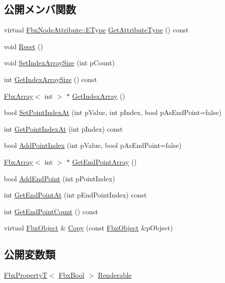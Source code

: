 \subsection*{公開メンバ関数}
\begin{DoxyCompactItemize}
\item 
virtual \hyperlink{class_fbx_node_attribute_a08e1669d3d1a696910756ab17de56d6a}{Fbx\+Node\+Attribute\+::\+E\+Type} \hyperlink{class_fbx_line_a3307097464d924b2c95c6687e41d69c9}{Get\+Attribute\+Type} () const
\item 
void \hyperlink{class_fbx_line_a68cc770a24367ac688fa3f96cdd5ed1f}{Reset} ()
\item 
void \hyperlink{class_fbx_line_ae954e7ff77330b0da208d727b194bf75}{Set\+Index\+Array\+Size} (int p\+Count)
\item 
int \hyperlink{class_fbx_line_a8055b3ec4b3dde0a73681716a33c77f5}{Get\+Index\+Array\+Size} () const
\item 
\hyperlink{class_fbx_array}{Fbx\+Array}$<$ int $>$ $\ast$ \hyperlink{class_fbx_line_abbb803913ad6eeb89e79eb3d9f58d3c2}{Get\+Index\+Array} ()
\item 
bool \hyperlink{class_fbx_line_a891629171b278b9ed9f8ebde8acca2b1}{Set\+Point\+Index\+At} (int p\+Value, int p\+Index, bool p\+As\+End\+Point=false)
\item 
int \hyperlink{class_fbx_line_a6ff2971e12ada06a4e724b97d149a875}{Get\+Point\+Index\+At} (int p\+Index) const
\item 
bool \hyperlink{class_fbx_line_a0829ee40fdecef0b749c3b026744c31a}{Add\+Point\+Index} (int p\+Value, bool p\+As\+End\+Point=false)
\item 
\hyperlink{class_fbx_array}{Fbx\+Array}$<$ int $>$ $\ast$ \hyperlink{class_fbx_line_aeeb413ccc5affa0f04d1b5275d355c9b}{Get\+End\+Point\+Array} ()
\item 
bool \hyperlink{class_fbx_line_ad648323a73b0b4f1bf9cfae2fdb65e23}{Add\+End\+Point} (int p\+Point\+Index)
\item 
int \hyperlink{class_fbx_line_a5a0bcc66d6ba13f98fd9e546bf5f704a}{Get\+End\+Point\+At} (int p\+End\+Point\+Index) const
\item 
int \hyperlink{class_fbx_line_a629b16ba4261ed6fdd77d8ae769f4026}{Get\+End\+Point\+Count} () const
\item 
virtual \hyperlink{class_fbx_object}{Fbx\+Object} \& \hyperlink{class_fbx_line_aeb9e0c53cf02d3e4e206b25c87c06256}{Copy} (const \hyperlink{class_fbx_object}{Fbx\+Object} \&p\+Object)
\end{DoxyCompactItemize}
\subsection*{公開変数類}
\begin{DoxyCompactItemize}
\item 
\hyperlink{class_fbx_property_t}{Fbx\+PropertyT}$<$ \hyperlink{fbxtypes_8h_a92e0562b2fe33e76a242f498b362262e}{Fbx\+Bool} $>$ \hyperlink{class_fbx_line_ab030d081f8127e48e92654e38fe2328e}{Renderable}
\end{DoxyCompactItemize}
